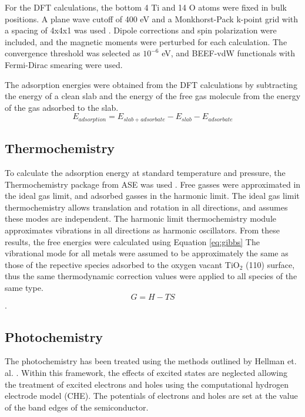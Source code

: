 For the DFT calculations, the bottom 4 Ti and 14 O atoms were fixed in bulk positions. A plane wave cutoff of 400 eV and a Monkhorst-Pack k-point grid with a spacing of 4x4x1 was used \cite{Monkhorst_1976}. Dipole corrections and spin polarization were included, and the magnetic moments were perturbed for each calculation. The convergence threshold was selected as $10^{-6}$ eV, and BEEF-vdW functionals \cite{Wellendorff_2012} with Fermi-Dirac smearing were used.

The adsorption energies were obtained from the DFT calculations by subtracting the energy of a clean slab and the energy of the free gas molecule from the energy of the gas adsorbed to the slab. 
\begin{equation}
E_{adsorption} = E_{slab+adsorbate} - E_{slab} - E_{adsorbate}
\end{equation}

\subsection{Thermochemistry}
\cite{ase-paper,Reuter_2005}

To calculate the adsorption energy at standard temperature and pressure, the Thermochemistry package from ASE was used \cite{ase-paper}. Free gasses were approximated in the ideal gas limit, and adsorbed gasses in the harmonic limit. The ideal gas limit thermochemistry allows translation and rotation in all directions, and assumes these modes are independent. The harmonic limit thermochemistry module approximates vibrations in all directions as harmonic oscillators. From these results, the free energies were calculated using Equation \ref{eq:gibbs} The vibrational mode for all metals were assumed to be approximately the same as those of the repective species adsorbed to the oxygen vacant TiO$_2$ (110) surface, thus the same thermodynamic correction values were applied to all species of the same type.
\begin{equation}
    G=H-TS
    \label{eq:gibbs}
\end{equation}. 

\subsection{Photochemistry}
The photochemistry has been treated using the methods outlined by Hellman et. al. \cite{Hellman2017}. Within this framework, the effects of excited states are neglected allowing the treatment of excited electrons and holes using the computational hydrogen electrode model (CHE). The potentials of electrons and holes are set at the value of the band edges of the semiconductor.

